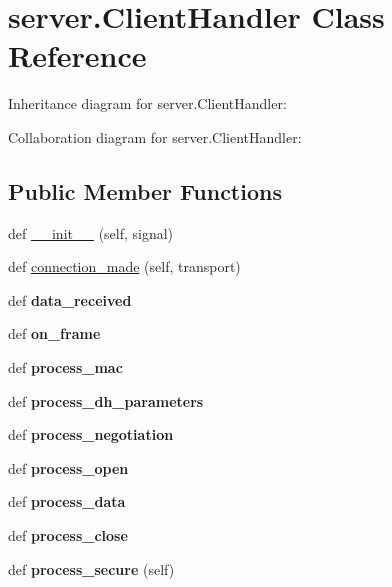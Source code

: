 \hypertarget{classserver_1_1ClientHandler}{}\section{server.\+Client\+Handler Class Reference}
\label{classserver_1_1ClientHandler}


Inheritance diagram for server.\+Client\+Handler\+:


Collaboration diagram for server.\+Client\+Handler\+:
\subsection*{Public Member Functions}
\begin{DoxyCompactItemize}
\item 
def \hyperlink{classserver_1_1ClientHandler_ac2ecc8db8969205430e7a85823eb8fd2}{\+\_\+\+\_\+init\+\_\+\+\_\+} (self, signal)
\item 
def \hyperlink{classserver_1_1ClientHandler_a3f1571d4b04ad740c031c3bafaf1a252}{connection\+\_\+made} (self, transport)
\item 
\mbox{\label{classserver_1_1ClientHandler_a1c662c56751637402caae83b02ae8c61}} 
def {\bfseries data\+\_\+received}
\item 
\mbox{\label{classserver_1_1ClientHandler_a629ad0c32091743b17472ff9e2966a7c}} 
def {\bfseries on\+\_\+frame}
\item 
\mbox{\label{classserver_1_1ClientHandler_a83fcf909168f4b2862330b350c73d4f9}} 
def {\bfseries process\+\_\+mac}
\item 
\mbox{\label{classserver_1_1ClientHandler_a7729ead01a86f66cd6516682f6fb72f6}} 
def {\bfseries process\+\_\+dh\+\_\+parameters}
\item 
\mbox{\label{classserver_1_1ClientHandler_a960473148e0aff74e603f4984a9745fe}} 
def {\bfseries process\+\_\+negotiation}
\item 
\mbox{\label{classserver_1_1ClientHandler_accf8157bb6ab7786fe87eaf5ec152089}} 
def {\bfseries process\+\_\+open}
\item 
\mbox{\label{classserver_1_1ClientHandler_a410c0eb966821582d747b26df36b54d6}} 
def {\bfseries process\+\_\+data}
\item 
\mbox{\label{classserver_1_1ClientHandler_a3b7a4258df475af1c5d0b2f945c5f03d}} 
def {\bfseries process\+\_\+close}
\item 
\mbox{\label{classserver_1_1ClientHandler_ac759fc4038a572f5af4f4205768b5213}} 
def {\bfseries process\+\_\+secure} (self)
\end{DoxyCompactItemize}
